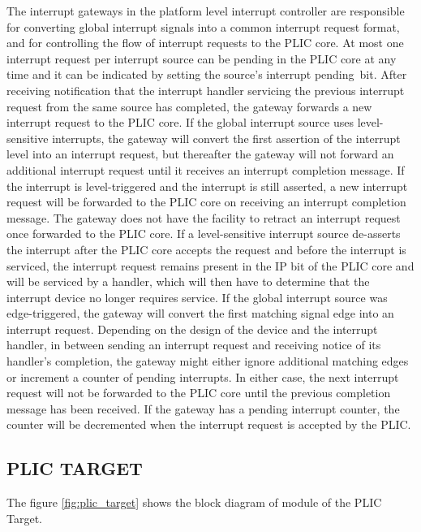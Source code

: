 The interrupt gateways in the platform level interrupt controller are responsible for converting global interrupt signals into a common interrupt request format, and for controlling the flow of interrupt requests to the PLIC core. At most one interrupt request per interrupt source can be pending in the PLIC core at any time and it can be indicated by setting the source’s interrupt pending bit. After receiving notification that the interrupt handler servicing the previous interrupt request from the same source has completed, the gateway forwards a new interrupt request to the PLIC core. If the global interrupt source uses level-sensitive interrupts, the gateway will convert the first assertion of the interrupt level into an interrupt request, but thereafter the gateway will not forward an additional interrupt request until it receives an interrupt completion message. If the interrupt is level-triggered and the interrupt is still asserted, a new interrupt request will be forwarded to the PLIC core on receiving an interrupt completion message. The gateway does not have the facility to retract an interrupt request once forwarded to the PLIC core. If a level-sensitive interrupt source de-asserts the interrupt after the PLIC core accepts the request and before the interrupt is serviced, the interrupt request remains present in the IP bit of the PLIC core and will be serviced by a handler, which will then have to determine that the interrupt device no longer requires service. If the global interrupt source was edge-triggered, the gateway will convert the first matching signal edge into an interrupt request. Depending on the design of the device and the interrupt handler, in between sending an interrupt request and receiving notice of its handler’s completion, the gateway might either ignore additional matching edges or increment a counter of pending interrupts. In either case, the next interrupt request will not be forwarded to the PLIC core until the previous completion message has been received. If the gateway has a pending interrupt counter, the counter will be decremented when the interrupt request is accepted by the PLIC.\\

\subsection{PLIC TARGET}
The figure \ref{fig:plic_target} shows the block diagram of module of the PLIC Target.\\

